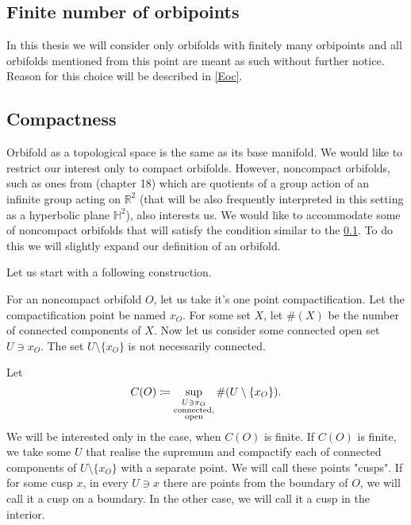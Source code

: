 \subsection{Finite number of orbipoints}\label{finite number of orbipoints}
In this thesis we will consider only orbifolds with finitely many orbipoints and all orbifolds 
mentioned from this point are meant as such without further notice. Reason for this 
choice will be described in \ref{Eoc}.  

\subsection{Compactness}\label{compactness}
Orbifold as a topological space is the same as its base manifold.
We would like to restrict our interest only to compact orbifolds. 
However, noncompact orbifolds, such as ones from \cite{Conway2016} (chapter 18) 
which are quotients 
of a group action of an infinite group acting on $\mathbb{R}^2$ (that will 
be also frequently interpreted in this setting as a hyperbolic plane $\mathbb{H}^2$), 
also interests us. We would like to accommodate some of noncompact orbifolds that 
will satisfy the condition similar to the \ref{finite number of orbipoints}. 
To do this we will slightly expand our definition of an orbifold. 

Let us start with a following construction.

For an noncompact orbifold $O$, let us take it's one point compactification. 
Let the compactification point be named $x_O$.  
For some set $X$, let $\#(X)$ be the number of connected components of $X$.
Now let us consider some connected open set $U \ni x_O$. The set $U\setminus\{x_O\}$ is 
not necessarily connected.
 
Let 
\begin{equation}
C(O) \coloneqq \sup\limits_{\substack{U \ni x_O \\ \rm connected, \\ \rm open }} 
\#(U\setminus\{x_O\}).
\end{equation}
We will be interested only in the case, when $C(O)$ is finite.
If $C(O)$ is finite, we take some $U$ that realise the supremum and compactify each of 
connected components of $U\setminus\{x_O\}$ with a separate point. We will call these points 
"cusps". If for some cusp $x$, in every $U \ni x$ there are points from the boundary of $O$, 
we will call it a cusp on a boundary. In the other case, we will call it a cusp in the interior.

